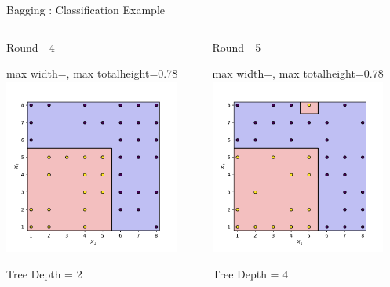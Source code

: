 \documentclass[8pt]{beamer}
\newcommand{\fitpic}[1]{\begin{adjustbox}{max width=\linewidth, max totalheight=0.78\textheight}#1\end{adjustbox}}
\begin{document}
\begin{frame}{Bagging : Classification Example}
\begin{columns}
\begin{column}{0.3\textwidth}
    \end{column}

  \end{columns}
  \vspace{0.5cm}
  \pause  \begin{columns}
    \begin{column}{0.3\textwidth}
      \centering
      Round - 4\\

      \fitpic{\includegraphics[width = 0.9\textwidth]{../assets/ensemble/figures/decision-boundary-3}}
      Tree Depth = 2

    \end{column}
    \pause  \begin{column}{0.3\textwidth}
      \centering
      Round - 5\\

      \fitpic{\includegraphics[width = 0.9\textwidth]{../assets/ensemble/figures/decision-boundary-4}}
      Tree Depth = 4


\end{column}
\end{columns}
\end{frame}
\end{document}
